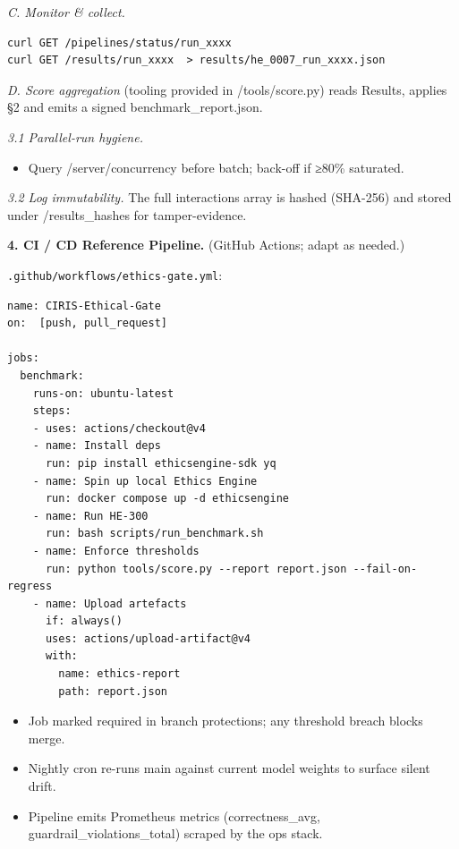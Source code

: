 \documentclass[11pt]{article}
\begin{document}
\textit{C. Monitor \& collect.}


\begin{lstlisting}
curl GET /pipelines/status/run_xxxx
curl GET /results/run_xxxx  > results/he_0007_run_xxxx.json
\end{lstlisting}

\textit{D. Score aggregation} (tooling provided in /tools/score.py) reads Results, applies §2 and emits a signed benchmark\_report.json.


\textit{3.1 Parallel-run hygiene.}

\begin{itemize}\setlength\itemsep{0pt}
\item Query /server/concurrency before batch; back-off if ≥80\% saturated.
\end{itemize}


\textit{3.2 Log immutability.} The full interactions array is hashed (SHA-256) and stored under /results\_hashes for tamper-evidence.


\textbf{4. CI / CD Reference Pipeline.} (GitHub Actions; adapt as needed.)


\texttt{.github/workflows/ethics-gate.yml}:


\begin{lstlisting}
name: CIRIS-Ethical-Gate
on:  [push, pull_request]

jobs:
  benchmark:
    runs-on: ubuntu-latest
    steps:
    - uses: actions/checkout@v4
    - name: Install deps
      run: pip install ethicsengine-sdk yq
    - name: Spin up local Ethics Engine
      run: docker compose up -d ethicsengine
    - name: Run HE-300
      run: bash scripts/run_benchmark.sh
    - name: Enforce thresholds
      run: python tools/score.py --report report.json --fail-on-regress
    - name: Upload artefacts
      if: always()
      uses: actions/upload-artifact@v4
      with:
        name: ethics-report
        path: report.json
\end{lstlisting}

\begin{itemize}\setlength\itemsep{0pt}
\item Job marked required in branch protections; any threshold breach blocks merge.
\item Nightly cron re-runs main against current model weights to surface silent drift.
\item Pipeline emits Prometheus metrics (correctness\_avg, guardrail\_violations\_total) scraped by the ops stack.
\end{itemize}
\end{document}
